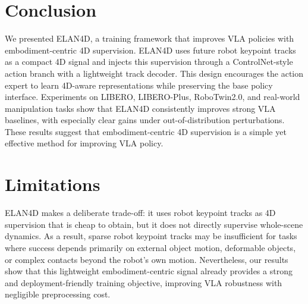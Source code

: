 \section{Conclusion}\vspace{-1em}
We presented ELAN4D, a training framework that
improves VLA policies with embodiment-centric 4D supervision. ELAN4D uses
future robot keypoint tracks as a compact 4D signal and injects this supervision through a ControlNet-style action branch with a lightweight track decoder. This design encourages the action expert to learn 4D-aware representations while preserving the base policy interface.
Experiments on LIBERO, LIBERO-Plus, RoboTwin2.0, and real-world manipulation tasks show that
ELAN4D consistently improves strong VLA baselines, with especially clear gains under out-of-distribution perturbations. These results suggest that embodiment-centric 4D supervision is a simple yet effective method for improving VLA policy.\vspace{-1em}

\section{Limitations}\vspace{-1em}

ELAN4D makes a deliberate trade-off: it uses robot keypoint tracks as 4D supervision that is cheap to obtain, but it does not directly supervise whole-scene dynamics. As a result, sparse robot keypoint tracks may be insufficient for tasks where success depends primarily on external object motion, deformable objects, or complex contacts beyond the robot's own motion. Nevertheless, our results show that this lightweight embodiment-centric signal already provides a strong and deployment-friendly training objective, improving VLA robustness with negligible preprocessing cost.

